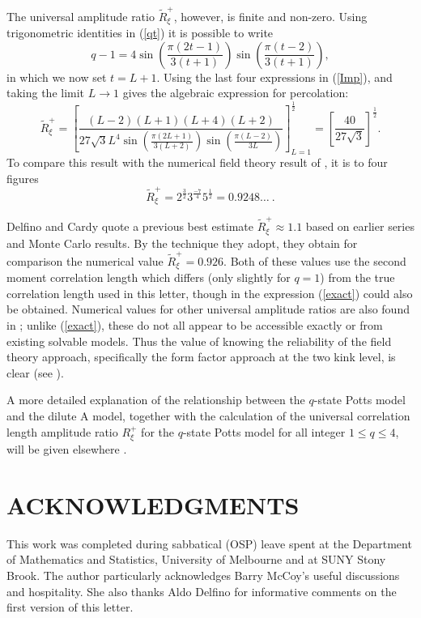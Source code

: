 \documentclass[a4paper,a4paper]{article}
\begin{document}
The universal amplitude
ratio $\tilde{R}^{+}_{\xi}$, however, is finite and non-zero. 
Using trigonometric identities in (\ref{qt}) it is possible to write
\begin{equation*}
q-1=4\sin\left(\frac{\pi(2t-1)}{3(t+1)}\right)
\sin\left(\frac{\pi(t-2)}{3(t+1)}\right),\label{rule}
\end{equation*}
in which we now set $t=L+1$.
Using the last four expressions
in (\ref{Imp}), and taking the limit $L \to 1$ gives the algebraic
expression  for percolation:
\begin{equation}
\tilde{R}^{+}_{\xi}=\left[\frac{(L-2)(L+1)(L+4)(L+2)}{27 \sqrt{3}L^4
\sin\left(\frac{\pi (2L+1)}{3(L+2)}\right)\sin\left(\frac{\pi(L-2)}{3L}
\right)}
\right]^{\frac{1}{2}}_{L=1}=\left[\frac{40}{27\sqrt{3}}\right]^{\frac{1}{2}}.
\label{exact}
\end{equation}
To compare this result with the numerical field theory result of 
\cite{dc}, it is to four figures
\begin{equation*}
\tilde{R}_{\xi}^{+}=2^{\frac{3}{2}}3^{\frac{-7}{4}}5^{\frac{1}{2}}=
0.9248\ldots\ .
\end{equation*}

Delfino and Cardy \cite{dc} quote a previous best estimate 
$\tilde{R}_{\xi}^{+} \approx
1.1$ based on earlier series \cite{dp} and 
Monte Carlo \cite{MC}
results.  By the technique they adopt,
they obtain for comparison the numerical value $\tilde{R}_{\xi}^{+}=0.926$. 
Both of these values use the second moment correlation length
which differs (only slightly for $q=1$) from the true
correlation length used in this letter, though in \cite{dc}
the expression (\ref{exact}) could also be obtained. 
Numerical values for other universal amplitude 
ratios are also found in \cite{dc};
unlike (\ref{exact}),  these 
do not all appear to be accessible exactly or from existing solvable models. 
Thus the value of knowing the reliability
of the field theory approach, specifically the
form factor approach at the two kink level, is clear (see \cite{cm}).
 

A more detailed explanation of the relationship between the $q$-state
Potts model and the dilute A model, together with the calculation 
of the universal correlation length amplitude
ratio $R_{\xi}^{+}$ for the $q$-state Potts model for all integer $1\leqslant q
\leqslant 4$, will be given elsewhere \cite{kas2}.





\section*{ACKNOWLEDGMENTS}
This work was completed during sabbatical (OSP) leave
spent at the Department of Mathematics and Statistics, University
of Melbourne and at SUNY Stony Brook. The author particularly acknowledges
Barry McCoy's useful discussions and hospitality. She also thanks
Aldo Delfino for informative comments on the first version of this letter.
\end{document}
